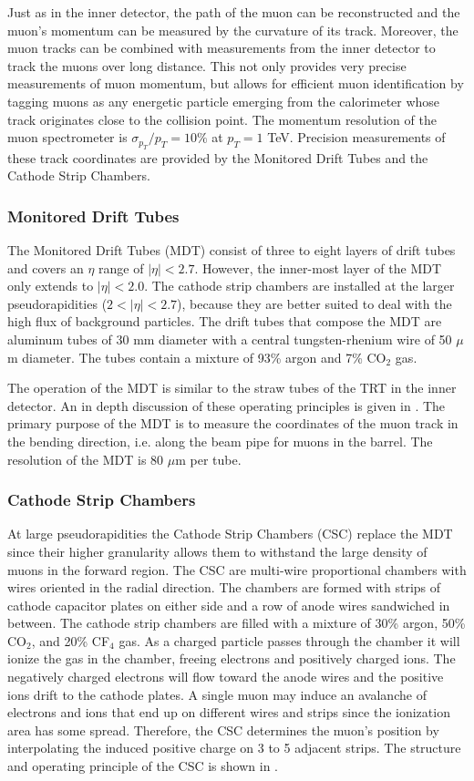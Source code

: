 Just as in the inner detector, the path of the muon can be reconstructed and
the muon's momentum can be measured by the curvature of its track. Moreover,
the muon tracks can be combined with measurements from the inner detector to 
track the muons over long distance.  This not only provides very precise measurements
of muon momentum, but allows for efficient muon identification by
tagging muons as any energetic particle emerging from the calorimeter whose track 
originates close to the collision point. The momentum resolution of the muon
spectrometer is $\sigma_{p_T}/p_T = 10\%$ at $p_T = 1$ TeV.
Precision measurements of these
track coordinates are provided by the Monitored Drift Tubes and the Cathode
Strip Chambers.

\subsubsection*{Monitored Drift Tubes}
The Monitored Drift Tubes (MDT) consist of three to eight layers of drift tubes
and covers an $\eta$ range of $|\eta| < 2.7$. However, the inner-most layer of
the MDT only extends to $|\eta| < 2.0$. The cathode strip chambers are installed at
the larger pseudorapidities ($2 < |\eta| < 2.7$), because they are better suited
to deal with the high flux of background particles. The drift tubes that
compose the MDT are aluminum tubes of 30 mm diameter with a central tungsten-rhenium
wire of 50 $\mu$m diameter. The tubes contain a mixture of 93\% argon and
7\% CO$_2$ gas.

The operation of the MDT is similar to the straw tubes of the TRT in the inner
detector. An in depth discussion of these operating principles is given
in . The primary purpose of the MDT is to measure the
coordinates of the muon track in the bending direction, i.e. along the
beam pipe for muons in the barrel. The resolution of the MDT is 80 $\mu$m per
tube.

\subsubsection*{Cathode Strip Chambers}
At large pseudorapidities the Cathode Strip Chambers (CSC) replace
the MDT since their higher granularity allows them to withstand the large
density of muons in the forward region. The CSC are multi-wire proportional
chambers with wires oriented in the radial direction. The chambers are formed
with strips of cathode capacitor plates on either side and a row of anode
wires sandwiched in between. The cathode strip chambers are filled with a mixture
of 30\% argon, 50\% CO$_2$, and 20\% CF$_4$ gas. As a charged particle passes
through the chamber it will ionize the gas in the chamber, freeing electrons
and positively charged ions. The negatively charged electrons will flow toward the
anode wires and the positive ions drift to the cathode plates. A single muon
may induce an avalanche of electrons and ions that end up on different wires
and strips since the ionization area has some spread. Therefore, the CSC
determines the muon's position by interpolating the induced positive charge on 
3 to 5 adjacent strips. 
The structure and operating principle of the CSC is shown in .

